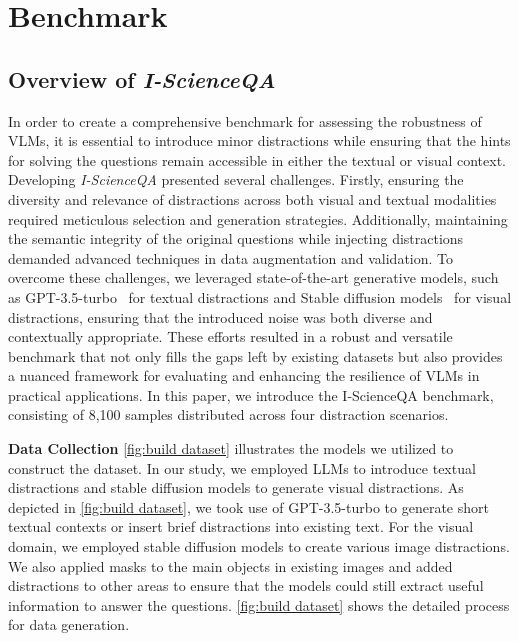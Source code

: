 \section{Benchmark}


\subsection{Overview of \emph{I-ScienceQA}}



In order to create a comprehensive benchmark for assessing the robustness of VLMs, it is essential to introduce minor distractions while ensuring that the hints for solving the questions remain accessible in either the textual or visual context. Developing \emph{I-ScienceQA} presented several challenges. Firstly, ensuring the diversity and relevance of distractions across both visual and textual modalities required meticulous selection and generation strategies. Additionally, maintaining the semantic integrity of the original questions while injecting distractions demanded advanced techniques in data augmentation and validation. To overcome these challenges, we leveraged state-of-the-art generative models, such as GPT-3.5-turbo~\citep{openai2024gpt35turbo} for textual distractions and Stable diffusion models~\citep{Rombach2021HighResolutionIS} for visual distractions, ensuring that the introduced noise was both diverse and contextually appropriate. These efforts resulted in a robust and versatile benchmark that not only fills the gaps left by existing datasets but also provides a nuanced framework for evaluating and enhancing the resilience of VLMs in practical applications. In this paper, we introduce the I-ScienceQA benchmark, consisting of 8,100 samples distributed across four distraction scenarios.


\textbf{Data Collection}  \autoref{fig:build dataset} illustrates the models we utilized to construct the dataset. In our study, we employed  LLMs to introduce textual distractions and stable diffusion models to generate visual distractions. As depicted in \autoref{fig:build dataset}, we took use of GPT-3.5-turbo to generate short textual contexts or insert brief distractions into existing text. For the visual domain, we employed stable diffusion models to create various image distractions. We also applied masks to the main objects in existing images and added distractions to other areas to ensure that the models could still extract useful information to answer the questions. \autoref{fig:build dataset} shows the detailed process for data generation.

